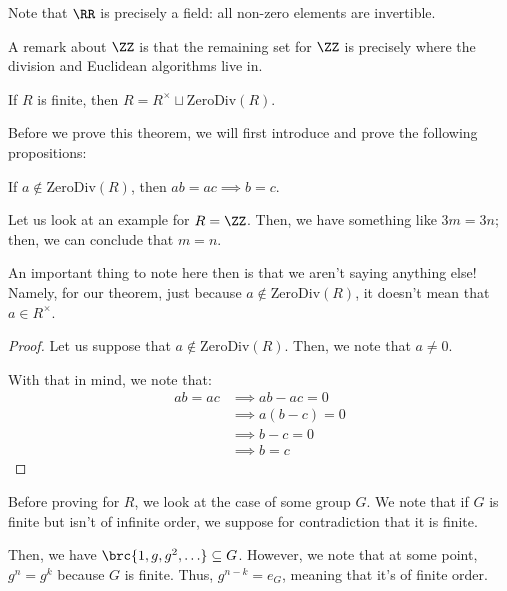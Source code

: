 \documentclass[openany]{book}
\begin{document}
\begin{rmk}
	Note that $\RR$ is precisely a field: all non-zero elements are invertible.
\end{rmk}

\begin{rmk}
	A remark about $\ZZ$ is that the remaining set for $\ZZ$ is precisely where the division and Euclidean algorithms live in.
\end{rmk}

\begin{thm}
	If $R$ is finite, then $R = R^{\times} \sqcup \mathrm{ZeroDiv}(R)$.
\end{thm}

Before we prove this theorem, we will first introduce and prove the following propositions:

\begin{prop}
	If $a \not\in \mathrm{ZeroDiv}(R)$, then $ab = ac \implies b = c$.
\end{prop}
\begin{example}
	Let us look at an example for $R = \ZZ$. Then, we have something like $3m = 3n$; then, we can conclude that $m = n$.
	
	An important thing to note here then is that we aren't saying anything else! Namely, for our theorem, just because $a \not\in \mathrm{ZeroDiv}(R)$, it doesn't mean that $a \in R^{\times}$.
\end{example}
\begin{proof}
	Let us suppose that $a \not\in \mathrm{ZeroDiv}(R)$. Then, we note that $a \neq 0$.
	
	With that in mind, we note that:
	\begin{align*}
		ab = ac &\implies ab-ac = 0 \\
		&\implies a(b-c) = 0 \\
		&\implies b-c = 0 \\
		&\implies b = c
	\end{align*}
\end{proof}

\begin{rmk}
	Before proving for $R$, we look at the case of some group $G$. We note that if $G$ is finite but isn't of infinite order, we suppose for contradiction that it is finite.
	
	Then, we have $\brc{1, g, g^{2}, \ldots} \subseteq G$. However, we note that at some point, $g^{n} = g^{k}$ because $G$ is finite. Thus, $g^{n-k} = e_G$, meaning that it's of finite order.
\end{rmk}
\end{document}
